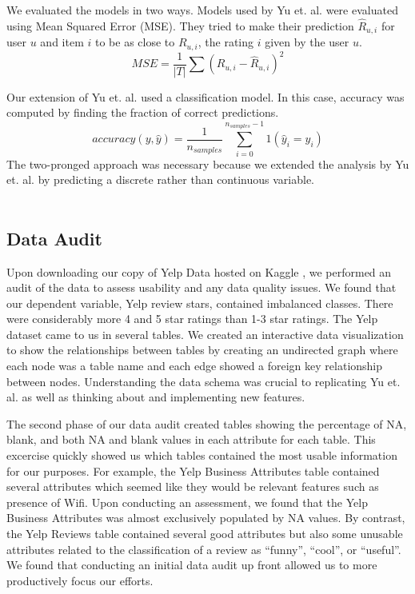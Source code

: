 \documentclass[12pt]{article}
\begin{document}
We evaluated the models in two ways. Models used by Yu et. al. \cite{yu2015restaurants}
were evaluated using Mean Squared Error (MSE). They tried to make their prediction $\hat{R}_{u,i}$
for user $u$ and item $i$ to be as close to $R_{u,i}$, the rating $i$ given by the user $u$.
\[
MSE = \frac{1}{|T|}\sum(R_{u,i} - \hat{R}_{u,i})^2
\]

Our extension of Yu et. al. \cite{yu2015restaurants} used a classification model. In this
case, accuracy was computed by finding the fraction of correct predictions.
\[
accuracy(y, \hat{y}) = \frac{1}{n_{samples}} \sum_{i=0}^{n_{samples} - 1} 1(\hat{y}_i = y_i)
\]
The two-pronged approach was necessary because we extended the analysis by Yu et. al.
\cite{yu2015restaurants} by predicting a discrete rather than continuous variable.\\ \\

\subsection{Data Audit}

Upon downloading our copy of Yelp Data hosted on Kaggle \cite{YelpData59:online}, we performed
an audit of the data to assess usability and any data quality issues. We found that our
dependent variable, Yelp review stars, contained imbalanced classes. There were considerably
more 4 and 5 star ratings than 1-3 star ratings. The Yelp dataset came to us in several tables.
We created an interactive data visualization to show the relationships between tables by creating
an undirected graph where each node was a table name and each edge showed a foreign key
relationship between nodes. Understanding the data schema was crucial to replicating
Yu et. al. \cite{yu2015restaurants} as well as thinking about and implementing new features.

The second phase of our data audit created tables showing the percentage of NA, blank, and
both NA and blank values in each attribute for each table. This excercise quickly showed us
which tables contained the most usable information for our purposes. For example, the Yelp
Business Attributes table contained several attributes which seemed like they would be
relevant features such as presence of Wifi. Upon conducting an assessment, we found that
the Yelp Business Attributes was almost exclusively populated by NA values. By contrast, the
Yelp Reviews table contained several good attributes but also some unusable attributes
related to the classification of a review as ``funny'', ``cool'', or ``useful''. We found
that conducting an initial data audit up front allowed us to more productively focus our
efforts.
\end{document}
